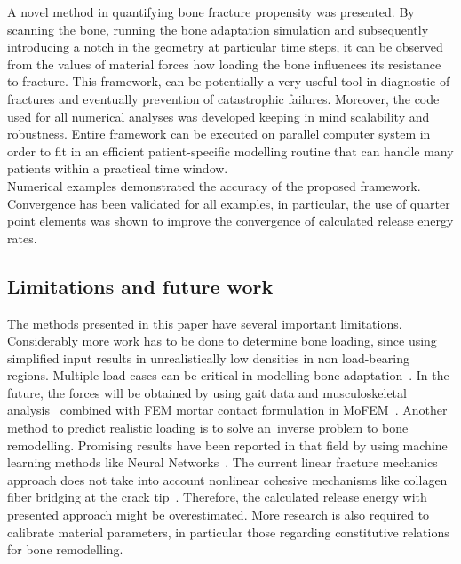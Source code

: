 \documentclass[11pt]{acmeArticle}
\numberwithin{equation}{section}
\begin{document}
A novel method in quantifying bone fracture propensity was presented. By scanning the bone, running the bone adaptation simulation and subsequently introducing a notch in the geometry at particular time steps, it can be observed from the values of material forces how loading the bone influences its resistance to fracture. 
This framework, can be potentially a very useful tool in diagnostic of fractures and eventually prevention of catastrophic failures. 
Moreover, the code used for all numerical analyses was developed keeping in mind scalability and robustness. 
Entire framework can be executed on parallel computer system in order to fit in an efficient patient-specific modelling routine that can handle many patients within a practical time window. \\

Numerical examples demonstrated the accuracy of the proposed framework. 
Convergence has been validated for all examples, in particular, the use of quarter point elements was shown to improve the convergence of calculated release energy rates. 
\subsection{Limitations and future work}
The methods presented in this paper have several important limitations. 
Considerably more work has to be done to determine bone loading, since using simplified input results in unrealistically low densities in non load-bearing regions. 
Multiple load cases can be critical in modelling bone adaptation~\citep{geraldes2016consideration}. 
In the future, the forces will be obtained by using gait data and musculoskeletal analysis~\citep{Delp2007} combined with FEM mortar contact formulation in MoFEM~\citep{athanasiadis2018mortar}. 
Another method to predict realistic loading is to solve an~inverse problem to bone remodelling. 
Promising results have been reported in that field by using machine learning methods like Neural Networks~\citep{campoli2012computational}. 
The current linear fracture mechanics approach does not take into account nonlinear cohesive mechanisms like collagen fiber bridging at the crack tip~\citep{yang2006fracture}. 
Therefore, the calculated release energy with presented approach might be overestimated. 
More research is also required to calibrate material parameters, in particular those regarding constitutive relations for bone remodelling. 


\end{document}
